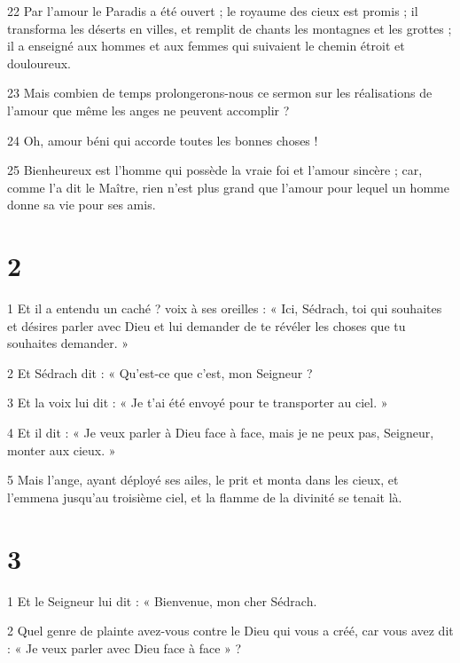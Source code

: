 \par 22 Par l'amour le Paradis a été ouvert ; le royaume des cieux est promis ; il transforma les déserts en villes, et remplit de chants les montagnes et les grottes ; il a enseigné aux hommes et aux femmes qui suivaient le chemin étroit et douloureux.

\par 23 Mais combien de temps prolongerons-nous ce sermon sur les réalisations de l'amour que même les anges ne peuvent accomplir ?

\par 24 Oh, amour béni qui accorde toutes les bonnes choses !

\par 25 Bienheureux est l'homme qui possède la vraie foi et l'amour sincère ; car, comme l'a dit le Maître, rien n'est plus grand que l'amour pour lequel un homme donne sa vie pour ses amis.

\chapter{2}

\par 1 Et il a entendu un caché ? voix à ses oreilles : « Ici, Sédrach, toi qui souhaites et désires parler avec Dieu et lui demander de te révéler les choses que tu souhaites demander. »

\par 2 Et Sédrach dit : « Qu'est-ce que c'est, mon Seigneur ?

\par 3 Et la voix lui dit : « Je t'ai été envoyé pour te transporter au ciel. »

\par 4 Et il dit : « Je veux parler à Dieu face à face, mais je ne peux pas, Seigneur, monter aux cieux. »

\par 5 Mais l'ange, ayant déployé ses ailes, le prit et monta dans les cieux, et l'emmena jusqu'au troisième ciel, et la flamme de la divinité se tenait là.

\chapter{3}

\par 1 Et le Seigneur lui dit : « Bienvenue, mon cher Sédrach.

\par 2 Quel genre de plainte avez-vous contre le Dieu qui vous a créé, car vous avez dit : « Je veux parler avec Dieu face à face » ?

